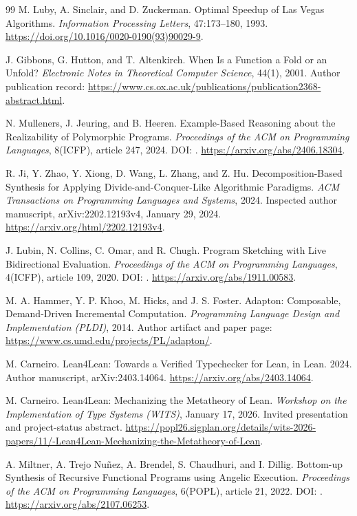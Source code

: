 \begin{thebibliography}{99}
M. Luby, A. Sinclair, and D. Zuckerman.
Optimal Speedup of Las Vegas Algorithms.
\emph{Information Processing Letters}, 47:173--180, 1993.
\url{https://doi.org/10.1016/0020-0190(93)90029-9}.

J. Gibbons, G. Hutton, and T. Altenkirch.
When Is a Function a Fold or an Unfold?
\emph{Electronic Notes in Theoretical Computer Science}, 44(1), 2001.
Author publication record:
\url{https://www.cs.ox.ac.uk/publications/publication2368-abstract.html}.

N. Mulleners, J. Jeuring, and B. Heeren.
Example-Based Reasoning about the Realizability of Polymorphic Programs.
\emph{Proceedings of the ACM on Programming Languages}, 8(ICFP), article 247, 2024.
DOI: .
\url{https://arxiv.org/abs/2406.18304}.

R. Ji, Y. Zhao, Y. Xiong, D. Wang, L. Zhang, and Z. Hu.
Decomposition-Based Synthesis for Applying Divide-and-Conquer-Like Algorithmic Paradigms.
\emph{ACM Transactions on Programming Languages and Systems}, 2024.
Inspected author manuscript, arXiv:2202.12193v4, January 29, 2024.
\url{https://arxiv.org/html/2202.12193v4}.

J. Lubin, N. Collins, C. Omar, and R. Chugh.
Program Sketching with Live Bidirectional Evaluation.
\emph{Proceedings of the ACM on Programming Languages}, 4(ICFP), article 109, 2020.
DOI: .
\url{https://arxiv.org/abs/1911.00583}.

M. A. Hammer, Y. P. Khoo, M. Hicks, and J. S. Foster.
Adapton: Composable, Demand-Driven Incremental Computation.
\emph{Programming Language Design and Implementation (PLDI)}, 2014.
Author artifact and paper page:
\url{https://www.cs.umd.edu/projects/PL/adapton/}.

M. Carneiro.
Lean4Lean: Towards a Verified Typechecker for Lean, in Lean.
2024. Author manuscript, arXiv:2403.14064.
\url{https://arxiv.org/abs/2403.14064}.

M. Carneiro.
Lean4Lean: Mechanizing the Metatheory of Lean.
\emph{Workshop on the Implementation of Type Systems (WITS)}, January 17, 2026.
Invited presentation and project-status abstract.
\url{https://popl26.sigplan.org/details/wits-2026-papers/11/-Lean4Lean-Mechanizing-the-Metatheory-of-Lean}.

A. Miltner, A. Trejo Nu\~nez, A. Brendel, S. Chaudhuri, and I. Dillig.
Bottom-up Synthesis of Recursive Functional Programs using Angelic Execution.
\emph{Proceedings of the ACM on Programming Languages}, 6(POPL), article 21, 2022.
DOI: .
\url{https://arxiv.org/abs/2107.06253}.


\end{thebibliography}
